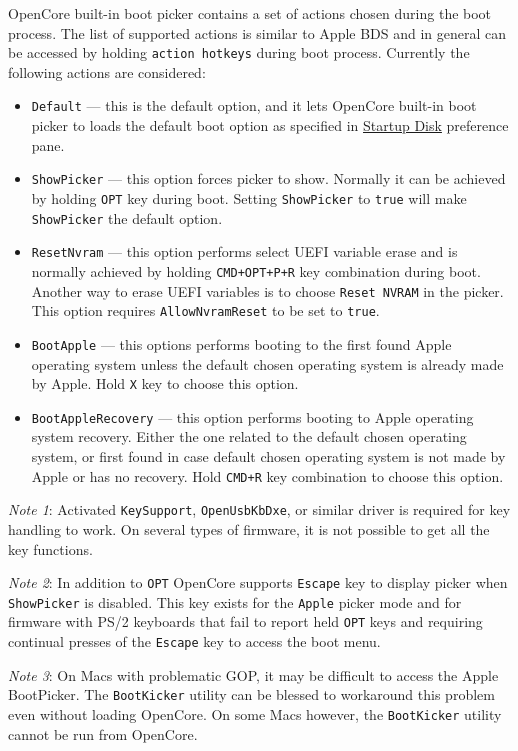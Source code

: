 \documentclass[]{article}
\providecommand{\tightlist}{%
  \setlength{\itemsep}{0pt}\setlength{\parskip}{0pt}}
\begin{document}
\begin{enumerate}
  OpenCore built-in boot picker contains a set of actions chosen during the boot process.
  The list of supported actions is similar to Apple BDS and in general can be accessed by
  holding \texttt{action hotkeys} during boot process. Currently the following actions are
  considered:

  \begin{itemize}
  \tightlist
  \item \texttt{Default} --- this is the default option, and it lets OpenCore built-in
  boot picker to loads the default boot option as specified in
  \href{https://support.apple.com/HT202796}{Startup Disk} preference pane.
  \item \texttt{ShowPicker} --- this option forces picker to show. Normally it can be
  achieved by holding \texttt{OPT} key during boot. Setting \texttt{ShowPicker} to
  \texttt{true} will make \texttt{ShowPicker} the default option.
  \item \texttt{ResetNvram} --- this option performs select UEFI variable erase and is
  normally achieved by holding \texttt{CMD+OPT+P+R} key combination during boot.
  Another way to erase UEFI variables is to choose \texttt{Reset NVRAM} in the picker.
  This option requires \texttt{AllowNvramReset} to be set to \texttt{true}.
  \item \texttt{BootApple} --- this options performs booting to the first found Apple
  operating system unless the default chosen operating system is already made by Apple.
  Hold \texttt{X} key to choose this option.
  \item \texttt{BootAppleRecovery} --- this option performs booting to Apple operating
  system recovery. Either the one related to the default chosen operating system,
  or first found in case default chosen operating system is not made by Apple or has no
  recovery. Hold \texttt{CMD+R} key combination to choose this option.
  \end{itemize}

  \emph{Note 1}: Activated \texttt{KeySupport}, \texttt{OpenUsbKbDxe}, or similar driver is required
  for key handling to work. On several types of firmware, it is not possible to get all the key functions.

  \emph{Note 2}: In addition to \texttt{OPT} OpenCore supports \texttt{Escape} key to display picker when
  \texttt{ShowPicker} is disabled. This key exists for the \texttt{Apple} picker mode and for
  firmware with PS/2 keyboards that fail to report held \texttt{OPT} keys and requiring continual
  presses of the \texttt{Escape} key to access the boot menu.

  \emph{Note 3}: On Macs with problematic GOP, it may be difficult to access the Apple BootPicker.
  The \texttt{BootKicker} utility can be blessed to workaround this problem even without loading
  OpenCore. On some Macs however, the \texttt{BootKicker} utility cannot be run from OpenCore.

\end{enumerate}
\end{document}
